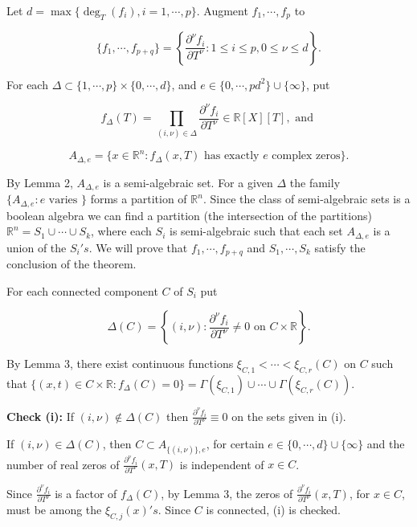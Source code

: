 \documentclass[12pt]{article}
\theoremstyle{mythm}
\let\oldendproof\endproof
\renewenvironment{proof}[1][\proofname]{%
  \oldproof[\normalfont \bfseries \sffamily #1]%
}{\oldendproof}
\renewcommand*{\proofname}{Proof}
\renewcommand*{\proofname}{Proof}
\renewcommand*{\proofname}{Proof}
\renewcommand*{\proofname}{Proof}
\renewcommand*{\proofname}{Proof}
\renewcommand*{\proofname}{Proof}
\renewcommand*{\proofname}{Proof}
\begin{document}
\begin{proof}

Let \( d = \max\{\deg_T(f_i), i = 1, \cdots, p\} \).  
Augment \( f_1, \cdots, f_p \) to  

\[
\{f_1, \cdots, f_{p+q}\} = \left\{\frac{\partial^\nu f_i}{\partial T^\nu} : 1 \leq i \leq p, 0 \leq \nu \leq d\right\}.
\]

For each \(\Delta \subset \{1, \cdots, p\} \times \{0, \cdots, d\}\), and \( e \in \{0, \cdots, pd^2\} \cup \{\infty\} \), put  

\[
f_\Delta(T) = \prod_{(i, \nu) \in \Delta} \frac{\partial^\nu f_i}{\partial T^\nu} \in \mathbb{R}[X][T], \text{ and }
\]

\[
A_{\Delta,e} = \{x \in \mathbb{R}^n : f_\Delta(x,T) \text{ has exactly } e \text{ complex zeros}\}.
\]

By Lemma 2, \( A_{\Delta,e} \) is a semi-algebraic set.  
For a given \(\Delta\) the family \(\{A_{\Delta,e} : e \text{ varies }\}\) forms a partition of \(\mathbb{R}^n\). Since the class of semi-algebraic sets is a boolean algebra we can find a partition (the intersection of the partitions) \(\mathbb{R}^n = S_1 \cup \cdots \cup S_k\), where each \(S_i\) is semi-algebraic such that each set \(A_{\Delta,e}\) is a union of the \(S_i's\). We will prove that \(f_1, \cdots, f_{p+q}\) and \(S_1, \cdots, S_k\) satisfy the conclusion of the theorem.

For each connected component \( C \) of \( S_i \) put

\[
\Delta(C) = \left\{(i, \nu) : \frac{\partial^\nu f_i}{\partial T^\nu} \neq 0 \text{ on } C \times \mathbb{R}\right\}.
\]

By Lemma 3, there exist continuous functions \(\xi_{C,1} < \cdots < \xi_{C,r}(C)\) on \( C \) such that \(\{(x,t) \in C \times \mathbb{R} : f_\Delta(C) = 0\} = \Gamma(\xi_{C,1}) \cup \cdots \cup \Gamma(\xi_{C,r}(C))\).

\textbf{Check (i):} If \((i, \nu) \notin \Delta(C)\) then \(\frac{\partial^\nu f_i}{\partial T^\nu} \equiv 0\) on the sets given in (i).

If \((i, \nu) \in \Delta(C)\), then \(C \subset A_{\{(i,\nu)\},e}\), for certain \(e \in \{0, \cdots, d\} \cup \{\infty\}\) and the number of real zeros of \(\frac{\partial^\nu f_i}{\partial T^\nu}(x,T)\) is independent of \(x \in C\).

Since \(\frac{\partial^\nu f_i}{\partial T^\nu}\) is a factor of \(f_\Delta(C)\), by Lemma 3, the zeros of \(\frac{\partial^\nu f_i}{\partial T^\nu}(x,T)\), for \(x \in C\), must be among the \(\xi_{C,j}(x)'s\). Since \(C\) is connected, (i) is checked.


\end{proof}
\end{document}
